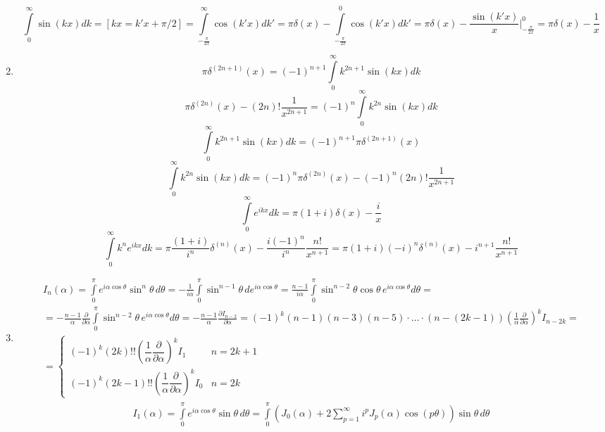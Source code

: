 \begin{enumerate}
\[	\]
	\[
		\int\limits_{0}^{\infty} \sin (kx) dk = [kx = k'x + \pi/2] = \int\limits_{-\frac{\pi}{2x}}^{\infty} \cos (k'x) dk' =
		\pi \delta(x) - \int\limits_{-\frac{\pi}{2x}}^{0} \cos (k'x) dk' = 
		\pi \delta(x) - \frac{\sin (k'x)}{x} \Big|_{-\frac{\pi}{2x}}^0 = 
		\pi \delta(x) - \frac{1}{x}
	\]
	\item 
	\[
		\pi \delta^{(2n+1)}(x) = (-1)^{n + 1} \int\limits_{0}^{\infty} k^{2n + 1} \sin (kx) dk
	\]
	\[
		\pi \delta^{(2n)}(x) - (2n)! \frac{1}{x^{2n+1}} = (-1)^{n} \int\limits_{0}^{\infty} k^{2n} \sin (kx) dk
	\]
	\[
		\int\limits_{0}^{\infty} k^{2n + 1} \sin (kx) dk = (-1)^{n + 1} \pi \delta^{(2n+1)}(x)
	\]
	\[
		\int\limits_{0}^{\infty} k^{2n} \sin (kx) dk = (-1)^{n} \pi \delta^{(2n)}(x) - (-1)^{n} (2n)! \frac{1}{x^{2n+1}}
	\]
	\[
		\int\limits_0^\infty e^{ikx} dk = \pi (1 + i) \delta(x) - \frac{i}{x}
	\]
	\[
		\int\limits_0^\infty k^n e^{ikx} dk = \pi \frac{(1 + i)}{i^n} \delta^{(n)}(x) - \frac{i(-1)^n}{i^n} \frac{n!}{x^{n+1}} =
		\pi (1 + i) (-i)^n \delta^{(n)}(x) - i^{n+1} \frac{n!}{x^{n+1}}
	\]
	\item
	\[
		\begin{gathered}
		I_n(\alpha) = \int\limits_0^\pi e^{i\alpha \cos \theta} \sin^n \theta \, d\theta = - \frac{1}{i\alpha} \int\limits_0^\pi  \sin^{n - 1} \theta \, de^{i\alpha \cos \theta} 
		=
		\frac{n - 1}{i\alpha} \int\limits_0^\pi  \sin^{n - 2} \theta \cos \theta \, e^{i\alpha \cos \theta} d\theta
		= \\ =
		- \frac{n - 1}{\alpha} \frac{\partial}{\partial \alpha} \int\limits_0^\pi  \sin^{n - 2} \theta \, e^{i\alpha \cos \theta} d\theta
		=
		- \frac{n - 1}{\alpha} \frac{\partial I_{n - 2}}{\partial \alpha} 
		=
		(-1)^k (n - 1)(n - 3)(n - 5)\cdot\ldots\cdot(n - (2k - 1)) \left(\frac{1}{\alpha} \frac{\partial}{\partial \alpha} \right)^k I_{n - 2k}
		= \\ =
		\begin{cases}
			(-1)^k (2k)!! \left(\dfrac{1}{\alpha} \dfrac{\partial}{\partial \alpha} \right)^k I_{1} & n = 2k + 1 \\
			(-1)^k (2k - 1)!! \left(\dfrac{1}{\alpha} \dfrac{\partial}{\partial \alpha} \right)^k I_{0} & n = 2k
		\end{cases}
		\end{gathered}
	\]
	\[
		\begin{gathered}
		I_1(\alpha) =
		\int\limits_0^\pi e^{i\alpha \cos \theta} \sin \theta \, d\theta
		=
		\int\limits_0^\pi 
		\left(
			J_0(\alpha) + 2\sum_{p = 1}^{\infty} i^p J_p(\alpha) \cos (p\theta) 
		\right)\sin \theta \, d\theta

\end{gathered}\]
\end{enumerate}
